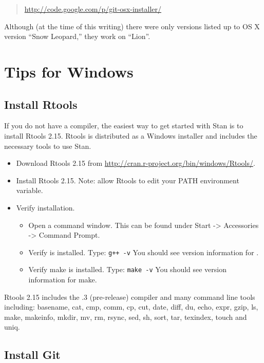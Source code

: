 \begin{quote}
\url{http://code.google.com/p/git-osx-installer/}
\end{quote}

Although (at the time of this writing) there were only versions listed
up to OS X version ``Snow Leopard,'' they work on ``Lion''.


\section{Tips for Windows}

\subsection{Install Rtools}

If you do not have a \Cpp compiler, the easiest way to get started
with Stan is to install Rtools 2.15. Rtools is distributed as a
Windows installer and includes the necessary tools to use Stan.

\begin{itemize}
  \item Download Rtools 2.15 from
    \url{http://cran.r-project.org/bin/windows/Rtools/}.
  \item Install Rtools 2.15. Note: allow Rtools to edit your PATH
    environment variable.
  \item Verify installation.
    \begin{itemize}
      \item Open a command window. This can be found under Start ->
        Accessories -> Command Prompt.
     \item Verify \gpp is installed. Type:  \Verb|g++ -v|
        You should see version information for \gpp.
     \item Verify make is installed. Type: \Verb|make -v|
      You should see version information for make.
    \end{itemize}
\end{itemize}

Rtools 2.15 includes the .3 (pre-release) compiler and many
command line tools including: basename, cat, cmp, comm, cp, cut, date,
diff, du, echo, expr, gzip, ls, make, makeinfo, mkdir, mv, rm, rsync,
sed, sh, sort, tar, texindex, touch and uniq.

\subsection{Install Git}

